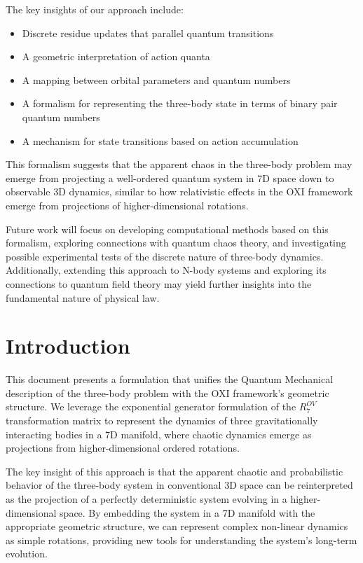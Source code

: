 \documentclass{article}
\begin{document}
The key insights of our approach include:
\begin{itemize}
\item Discrete residue updates that parallel quantum transitions
\item A geometric interpretation of action quanta
\item A mapping between orbital parameters and quantum numbers
\item A formalism for representing the three-body state in terms of binary pair quantum numbers
\item A mechanism for state transitions based on action accumulation
\end{itemize}

This formalism suggests that the apparent chaos in the three-body problem may emerge from projecting a well-ordered quantum system in 7D space down to observable 3D dynamics, similar to how relativistic effects in the OXI framework emerge from projections of higher-dimensional rotations.

Future work will focus on developing computational methods based on this formalism, exploring connections with quantum chaos theory, and investigating possible experimental tests of the discrete nature of three-body dynamics. Additionally, extending this approach to N-body systems and exploring its connections to quantum field theory may yield further insights into the fundamental nature of physical law.



\section{Introduction}

This document presents a formulation that unifies the Quantum Mechanical description of the three-body problem with the OXI framework's geometric structure. We leverage the exponential generator formulation of the $R^{OV}_7$ transformation matrix to represent the dynamics of three gravitationally interacting bodies in a 7D manifold, where chaotic dynamics emerge as projections from higher-dimensional ordered rotations.

The key insight of this approach is that the apparent chaotic and probabilistic behavior of the three-body system in conventional 3D space can be reinterpreted as the projection of a perfectly deterministic system evolving in a higher-dimensional space. By embedding the system in a 7D manifold with the appropriate geometric structure, we can represent complex non-linear dynamics as simple rotations, providing new tools for understanding the system's long-term evolution.
\end{document}
